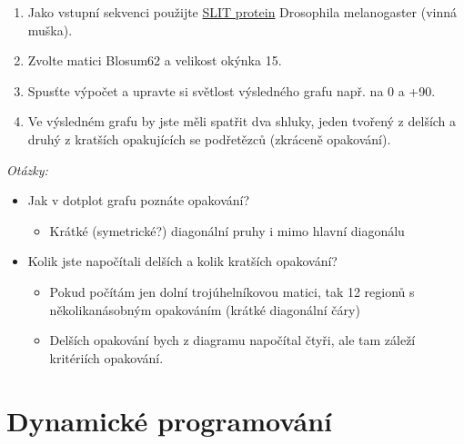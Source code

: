 \documentclass[11pt]{article}
\begin{document}
\begin{enumerate}
\item Jako vstupní sekvenci použijte \href{data/dotlet\_rep.txt}{SLIT protein} Drosophila melanogaster (vinná
muška).
\item Zvolte matici Blosum62 a velikost okýnka 15.
\item Spusťte výpočet a upravte si světlost výsledného grafu např. na 0 a +90.
\item Ve výsledném grafu by jste měli spatřit dva shluky, jeden tvořený z delších a
druhý z kratších opakujících se podřetězců (zkráceně opakování).
\end{enumerate}

\emph{Otázky:}
\begin{itemize}
\item Jak v dotplot grafu poznáte opakování?
\begin{itemize}
\item Krátké (symetrické?) diagonální pruhy i mimo hlavní diagonálu
\end{itemize}
\item Kolik jste napočítali delších a kolik kratších opakování?
\begin{itemize}
\item Pokud počítám jen dolní trojúhelníkovou matici, tak 12 regionů s
několikanásobným opakováním (krátké diagonální čáry)
\item Delších opakování bych z diagramu napočítal čtyři, ale tam záleží kritériích
opakování.
\end{itemize}
\end{itemize}

\section{Dynamické programování}
\label{sec:orge6d4ffe}
\end{document}
